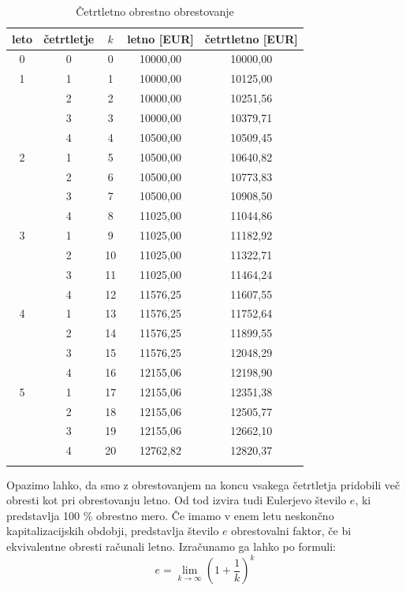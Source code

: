 \documentclass[12pt]{article}
\begin{document}
        \begin{longtable}{|c|c|c|c|c|}
            \hline
            \textbf{leto} & \textbf{četrtletje} & \textbf{$k$} & \textbf{letno [EUR]} & \textbf{četrtletno [EUR]} \\ \hline
            \endfirsthead
            \endhead
            0 & 0  & 0   & 10000,00 & 10000,00 \\ \hline \hline
            1 & 1  & 1   & 10000,00 & 10125,00 \\ \hline
              & 2  & 2   & 10000,00 & 10251,56 \\ \hline
              & 3  & 3   & 10000,00 & 10379,71 \\ \hline
              & 4  & 4   & 10500,00 & 10509,45 \\ \hline \hline
            2 & 1  & 5   & 10500,00 & 10640,82 \\ \hline 
              & 2  & 6   & 10500,00 & 10773,83 \\ \hline
              & 3  & 7   & 10500,00 & 10908,50 \\ \hline
              & 4  & 8   & 11025,00 & 11044,86 \\ \hline \hline
            3 & 1  & 9   & 11025,00 & 11182,92 \\ \hline 
              & 2  & 10  & 11025,00 & 11322,71 \\ \hline
              & 3  & 11  & 11025,00 & 11464,24 \\ \hline
              & 4  & 12  & 11576,25 & 11607,55 \\ \hline \hline
            4 & 1  & 13  & 11576,25 & 11752,64 \\ \hline 
              & 2  & 14  & 11576,25 & 11899,55 \\ \hline
              & 3  & 15  & 11576,25 & 12048,29 \\ \hline
              & 4  & 16  & 12155,06 & 12198,90 \\ \hline \hline
            5 & 1  & 17  & 12155,06 & 12351,38 \\ \hline 
              & 2  & 18  & 12155,06 & 12505,77 \\ \hline
              & 3  & 19  & 12155,06 & 12662,10 \\ \hline
              & 4  & 20  & 12762,82 & 12820,37 \\ \hline
            \caption{Četrtletno obrestno obrestovanje}
        \end{longtable}

        Opazimo lahko, da smo z obrestovanjem na koncu vsakega četrtletja pridobili več obresti
        kot pri obrestovanju letno. Od tod izvira tudi Eulerjevo število $e$, ki predstavlja
        100 \% obrestno mero. Če imamo v enem letu neskončno kapitalizacijskih obdobji,
        predstavlja število $e$ obrestovalni faktor, če bi ekvivalentne obresti računali letno.
        Izračunamo ga lahko po formuli: \hfill \cite{wiki:euler}
        \begin{equation}
            e = \lim_{k \to \infty} (1 + \frac{1}{k})^k
        \end{equation}
\end{document}
